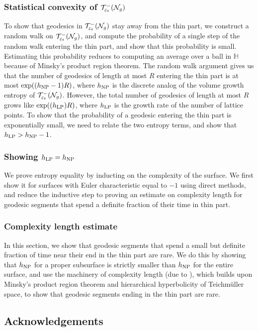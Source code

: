 \subsubsection*{Statistical convexity of $\mathcal{T}_{\varepsilon_t}^{-}(\mathcal{N}_g)$}
To show that geodesics in $\mathcal{T}_{\varepsilon_t}^{-}(\mathcal{N}_g)$ stay away from the thin part, we construct a random walk on $\mathcal{T}_{\varepsilon_t}^{-}(\mathcal{N}_g)$, and compute the probability of a single step of the random walk entering the thin part, and show that this probability is small.
Estimating this probability reduces to computing an average over a ball in $\mathbb{H}$ because of Minsky's product region theorem.
The random walk argument gives us that the number of geodesics of length at most $R$ entering the thin part is at most $\exp((h_{\mathrm{NP}} - 1)R)$, where $h_{\mathrm{NP}}$ is the discrete analog of the volume growth entropy of $\mathcal{T}_{\varepsilon_t}^{-}(\mathcal{N}_g)$.
However, the total number of geodesics of length at most $R$ grows like $\exp((h_{\mathrm{LP}})R)$, where $h_{\mathrm{LP}}$ is the growth rate of the number of lattice points.
To show that the probability of a geodesic entering the thin part is exponentially small, we need to relate the two entropy terms, and show that $h_{\mathrm{LP}} > h_{\mathrm{NP}} - 1$.

\subsubsection*{Showing $h_{\mathrm{LP}} = h_{\mathrm{NP}}$}
We prove entropy equality by inducting on the complexity of the surface.
We first show it for surfaces with Euler characteristic equal to $-1$ using direct methods, and reduce the inductive step to proving an estimate on complexity length for geodesic segments that spend a definite fraction of their time in thin part.

\subsubsection*{Complexity length estimate}

In this section, we
show that geodesic segments that spend a small but definite fraction of time near their end in the thin part are rare.
We do this by showing that $h_{\mathrm{NP}}$ for a proper subsurface is strictly smaller than $h_{\mathrm{NP}}$ for the entire surface, and use the machinery of complexity length (due to \textcite{dowdall2023lattice}), which builds upon Minsky's product region theorem and hierarchical hyperbolicity of Teichmüller space, to show that geodesic segments ending in the thin part are rare.

\subsection*{Acknowledgements}





